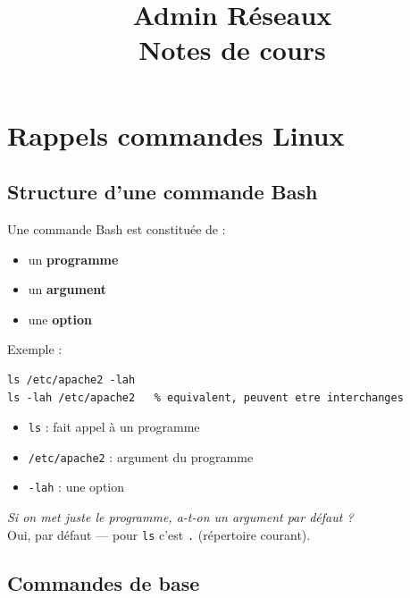 \documentclass[a4paper,12pt]{article}
\title{\Huge\textbf{Admin Réseaux}\\[0.5em]\large Notes de cours}
\date{}
\begin{document}
\maketitle
\tableofcontents
\newpage

\section{Rappels commandes Linux}

\subsection{Structure d'une commande Bash}

Une commande Bash est constituée de :
\begin{itemize}
    \item un \textbf{programme}
    \item un \textbf{argument}
    \item une \textbf{option}
\end{itemize}

Exemple :
\begin{lstlisting}
ls /etc/apache2 -lah
ls -lah /etc/apache2   % equivalent, peuvent etre interchanges
\end{lstlisting}

\begin{itemize}
    \item \texttt{ls} : fait appel à un programme
    \item \texttt{/etc/apache2} : argument du programme
    \item \texttt{-lah} : une option
\end{itemize}

\textit{Si on met juste le programme, a-t-on un argument par défaut ?}\\
Oui, par défaut — pour \texttt{ls} c'est \texttt{.} (répertoire courant).

\subsection{Commandes de base}
\end{document}
